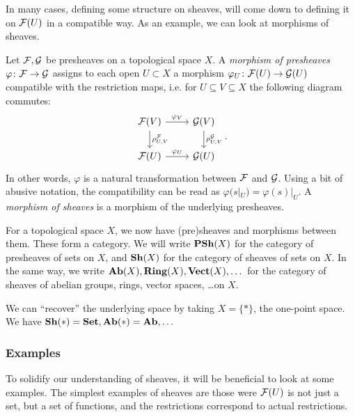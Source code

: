 \documentclass{article}
\begin{document}
In many cases, defining some structure on sheaves, will come down
to defining it on $\mathcal{F}(U)$ in a compatible way.
As an example, we can look at morphisms of sheaves.
\begin{definition}
    Let $\mathcal{F}, \mathcal{G}$ be presheaves on a topological space $X$.
    A  \emph{morphism of presheaves} $\varphi \colon \mathcal{F} \to \mathcal{G}$ assigns to
    each open $U\subset X$ a morphism $\varphi_U \colon \mathcal{F}(U) \to \mathcal{G}(U)$
    compatible with the restriction maps, i.e. for $U\subseteq V \subseteq X$
    the following diagram commutes:
    \begin{equation*}
        \begin{tikzcd}
            \mcF(V) \rar["\varphi_V"] \dar["\rho^\mcF_{U,V}"]
            & \mcG(V) \dar["\rho^\mcG_{U,V}"] \\
            \mcF(U) \rar["\varphi_U"]
            & \mcG(U)
        \end{tikzcd}.
    \end{equation*}
    In other words, $\varphi$ is a natural transformation between $\mathcal{F}$ and $\mathcal{G}$.
    Using a bit of abusive notation, the compatibility can be read as
    $\varphi(s|_U) = \varphi(s)|_U$.
    A \emph{morphism of sheaves} is a morphism of the underlying presheaves.
\end{definition}

For a topological space $X$, we now have (pre)sheaves and morphisms between them.
These form a category. We will write $\operatorname{\mathbf{PSh}}(X)$ for the category of presheaves of
sets on $X$, and $\operatorname{\mathbf{Sh}}(X)$ for the category of sheaves of sets on $X$.
In the same way, we write $\operatorname{\mathbf{Ab}}(X), \operatorname{\mathbf{Ring}}(X), \operatorname{\mathbf{Vect}}(X),\dots $ for the category of
sheaves of abelian groups, rings, vector spaces, \dots on $X$.
\begin{remark}
    We can ``recover'' the underlying space by taking $X = \{*\}$,
    the one-point space. We have $\operatorname{\mathbf{Sh}}(*) = \operatorname{\mathbf{Set}}, \operatorname{\mathbf{Ab}}(*) = \operatorname{\mathbf{Ab}}, \dots$
\end{remark}

\subsubsection{Examples}
To solidify our understanding of sheaves, it will be beneficial to look
at some examples.
The simplest examples of sheaves are those were
$\mathcal{F}(U)$ is not just a set, but a set of functions, and the
restrictions correspond to actual restrictions.
\end{document}
